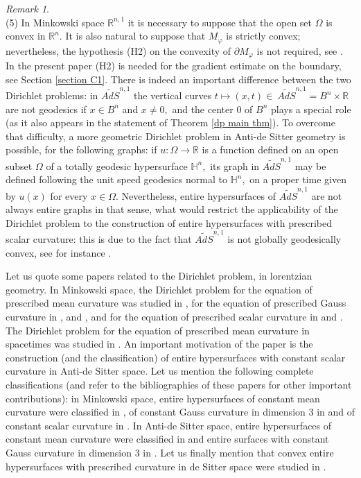 \documentclass[10pt,reqno,oneside]{amsart}
\theoremstyle{definition}
\theoremstyle{remark}
\newtheorem{rem}[lem]{Remark}
\newcommand{\R}{\mathbb{R}}
\begin{document}
\begin{rem}
\\(5) In Minkowski space $\R^{n,1}$ it is necessary to suppose that the open set $\Omega$ is convex in $\R^n$. It is also natural to suppose that $M_{\varphi}$ is strictly convex; nevertheless, the  hypothesis (H2) on the convexity of $\partial M _{\varphi}$ is not required, see \cite{Bay1}. In the present paper (H2) is needed for the gradient estimate on the boundary, see Section \ref{section C1}. There is indeed an important difference between the two Dirichlet problems: in $\widetilde{AdS}^{n,1}$ the vertical curves $t\mapsto (x,t)\in\ \widetilde{AdS}^{n,1}=B^n\times\R$ are not geodesics if $x\in B^n$ and $x\neq 0,$ and the center $0$ of $B^n$ plays a special role (as it also appears in the statement of Theorem \ref{dp main thm}). To overcome that difficulty, a more geometric Dirichlet problem in Anti-de Sitter geometry is possible, for the following graphs: if $u:\Omega\rightarrow\R$ is a function defined on an open subset $\Omega$ of a totally geodesic hypersurface $\mathbb{H}^n,$ its graph in $\widetilde{AdS}^{n,1}$ may be defined following the unit speed geodesics normal to $\mathbb{H}^n,$ on a proper time given by $u(x)$ for every $x\in\Omega.$ Nevertheless, entire hypersurfaces of $\widetilde{AdS}^{n,1}$ are not always entire graphs in that sense, what would restrict the applicability of the Dirichlet problem to the construction of entire hypersurfaces with prescribed scalar curvature: this is due to the fact that $\widetilde{AdS}^{n,1}$ is not globally geodesically convex, see for instance \cite{BoSe1}. 
\end{rem}
Let us quote some papers related to the Dirichlet problem, in lorentzian geometry. In Minkowski space, the Dirichlet problem for the equation of prescribed mean curvature was studied in \cite{BaSi}, for the equation of prescribed Gauss curvature in \cite{De}, \cite{BGuan} and \cite{AMLi}, and for the equation of prescribed scalar curvature in \cite{Bay1} and \cite{Ur}. The Dirichlet problem for the equation of prescribed mean curvature in spacetimes was studied in \cite{Bar}. An important motivation of the paper is the construction (and the classification) of entire hypersurfaces with constant scalar curvature in Anti-de Sitter space. Let us mention the following complete classifications (and refer to the bibliographies of these papers for other important contributions): in Minkowski space, entire hypersurfaces of constant mean curvature were classified in \cite{BoSeSmi2}, of constant Gauss curvature in dimension 3 in \cite{BoSeSmi1} and of constant scalar curvature in \cite{BS}. In Anti-de Sitter space, entire hypersurfaces of constant mean curvature were classified in \cite{Tre} and entire surfaces with constant Gauss curvature in dimension 3 in \cite{BoSe2}. Let us finally mention that convex entire hypersurfaces with prescribed curvature in de Sitter space were studied in \cite{SX}.
\\
\end{document}
